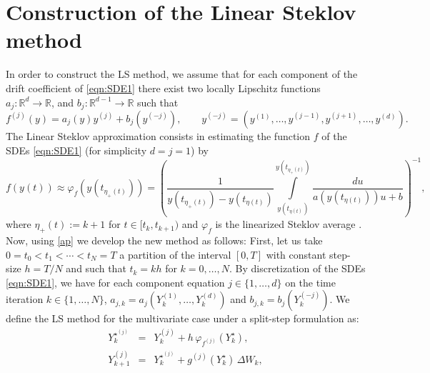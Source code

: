 \documentclass[sort&compress, preprint]{elsarticle}
\theoremstyle{definition}
\theoremstyle{plain}%
\theoremstyle{remark}
\newcommand{\SM}{LS\xspace}
\begin{document}

\section{Construction of the Linear Steklov method} 

\newcommand{\BigFig}[1]{\parbox{12pt}{\Huge #1}}
\newcommand{\BigZero}{\BigFig{0}}
%
In order to construct the LS method, we assume that  for each component of the drift coefficient of \eqref{eqn:SDE1} there exist 
two locally Lipschitz functions $a_j:\mathbb{R}^{d} \to \mathbb{R}$, and
		$b_{j}:\mathbb{R}^{d-1} \to \mathbb{R}$ such that 
		\begin{equation}\label{eqn:AlternativeConstruction}
		f^{(j)}(y) = a_j (y) y^{(j)} + b_{j}(y^{(-j)}), \qquad
		y^{(-j)} = (y^{(1)}, \dots ,y^{(j-1)}, y^{(j+1)}, \dots, y^{(d)}).
		\end{equation}
The Linear Steklov approximation consists in estimating the function $f$ of 
	the SDEs \eqref{eqn:SDE1} (for simplicity $d=j=1$) by 
\begin{equation} \label{ap}
	f(y(t)) \approx 
		\varphi_{f}(y(t_{\eta_{+}(t)})) =
		\left(
			\frac{1}{y(t_{\eta_+(t)})-y(t_{\eta (t)})}
			\int \limits
_				{y(t_{\eta(t)})}^{y(t_{\eta_+(t)})}
					\frac{du}
						{
							a(y(t_{\eta(t)}))u
							+b
						}
	\right)^{-1},
\end{equation}
where  $\eta_+(t):=k+1$ for $t\in[t_k,t_{k+1})$ and $\varphi_f$ 
is the linearized Steklov average \cite{Diaz-Infante2015}. 
Now, using \eqref{ap} we develop the new  method as follows: 
First, let us take  $0=t_0 < t_1< \cdots < t_N=T$ a partition of the interval $[0,T]$ with 
constant step-size $h=T/N$ and such that $t_k=kh$ for $k=0,\ldots, N$.  By discretization
of the SDEs \eqref{eqn:SDE1}, we have for  each component equation $j\in\{1, \ldots,  d\}$ 
	on  the time iteration  $k\in\{1, \ldots,  N\}$, 
	$a_{j,k} =a_j
	\left(
		Y^{(1)}_{k},
		\ldots, Y^{(d)}_{k}
	\right)$  and $b_{j,k} =
	b_{j}
	\left(
			Y^{(-j)}_k
	\right)$. We define the \SM method for 
	the multivariate case under 
a split-step  formulation as:
\begin{eqnarray}
 	Y_{k}^{{\star}^{(j)}} &=& Y_k^{(j)} + h\, \varphi_{f^{(j)}}(Y^{\star}_k), \label{eqn:SSLSM1}\\
	Y_{k+1}^{(j)}	&=& Y_k^{{\star}^{(j)}} + g^{(j)}(Y_k^{\star})\, \Delta W_k 
	\label{eqn:SSLSM2},
\end{eqnarray}
\end{document}

